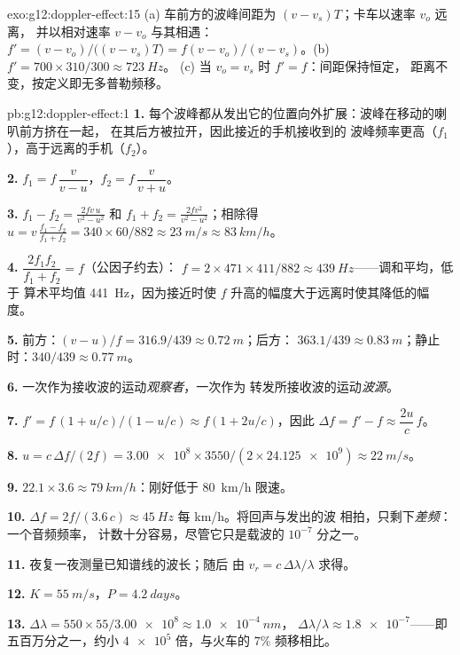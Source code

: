 \begin{solution}{exo:g12:doppler-effect:15}
(a) 车前方的波峰间距为 $(v - v_s)T$；卡车以速率 $v_o$ 远离，
并以相对速率 $v - v_o$ 与其相遇：$f' = (v - v_o)/\bigl((v - v_s)T\bigr) =
f(v - v_o)/(v - v_s)$。(b) $f' = 700 \times 310/300 \approx \qty{723}{Hz}$。
(c) 当 $v_o = v_s$ 时 $f' = f$：间距保持恒定，
距离不变，按定义即无多普勒频移。
\end{solution}

\begin{solution}{pb:g12:doppler-effect:1}
\textbf{1.} 每个波峰都从发出它的位置向外扩展：波峰在移动的喇叭前方挤在一起，
在其后方被拉开，因此接近的手机接收到的
波峰频率更高（$f_1$），高于远离的手机（$f_2$）。

\textbf{2.} $f_1 = f\,\dfrac{v}{v - u}$，\quad $f_2 = f\,\dfrac{v}{v + u}$。

\textbf{3.} $f_1 - f_2 = \frac{2fv\,u}{v^2 - u^2}$ 和 $f_1 + f_2 =
\frac{2fv^2}{v^2 - u^2}$；相除得 $u = v\,\frac{f_1 - f_2}{f_1 + f_2} =
340 \times 60/882 \approx \qty{23}{m/s} \approx \qty{83}{km/h}$。

\textbf{4.} $\dfrac{2f_1 f_2}{f_1 + f_2} = f$（公因子约去）：
$f = 2 \times 471 \times 411/882 \approx \qty{439}{Hz}$——调和平均，低于
算术平均值 \qty{441}{Hz}，因为接近时使 $f$ 升高的幅度大于远离时使其降低的幅度。

\textbf{5.} 前方：$(v - u)/f = 316.9/439 \approx \qty{0.72}{m}$；后方：
$363.1/439 \approx \qty{0.83}{m}$；静止时：$340/439 \approx \qty{0.77}{m}$。

\textbf{6.} 一次作为接收波的运动\emph{观察者}，一次作为
转发所接收波的运动\emph{波源}。

\textbf{7.} $f' = f\,(1 + u/c)/(1 - u/c) \approx f(1 + 2u/c)$，因此
$\Delta f = f' - f \approx \dfrac{2u}{c}\,f$。

\textbf{8.} $u = c\,\Delta f/(2f) = \num{3.00e8} \times 3550/(2 \times \num{24.125e9})
\approx \qty{22}{m/s}$。

\textbf{9.} $22.1 \times 3.6 \approx \qty{79}{km/h}$：刚好低于 \qty{80}{km/h}
限速。

\textbf{10.} $\Delta f = 2f/(3.6\,c) \approx \qty{45}{Hz}$ 每 \unit{km/h}。将回声与发出的波
相拍，只剩下\emph{差频}：一个音频频率，
计数十分容易，尽管它只是载波的 $10^{-7}$ 分之一。

\textbf{11.} 夜复一夜测量已知谱线的波长；随后
由 $v_r = c\,\Delta\lambda/\lambda$ 求得。

\textbf{12.} $K = \qty{55}{m/s}$，$P = \qty{4.2}{days}$。

\textbf{13.} $\Delta\lambda = 550 \times 55/\num{3.00e8} \approx \qty{1.0e-4}{nm}$，
$\Delta\lambda/\lambda \approx \num{1.8e-7}$——即五百万分之一，约小
$\num{4e5}$ 倍，与火车的 $7\%$ 频移相比。


\end{solution}
